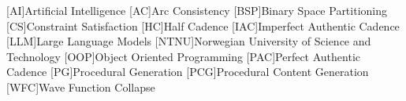 [AI]{Artificial Intelligence}
[AC]{Arc Consistency}
[BSP]{Binary Space Partitioning}
[CS]{Constraint Satisfaction}
[HC]{Half Cadence}
[IAC]{Imperfect Authentic Cadence}
[LLM]{Large Language Models}
[NTNU]{Norwegian University of Science and Technology}
[OOP]{Object Oriented Programming}
[PAC]{Perfect Authentic Cadence}
[PG]{Procedural Generation}
[PCG]{Procedural Content Generation}
[WFC]{Wave Function Collapse}
